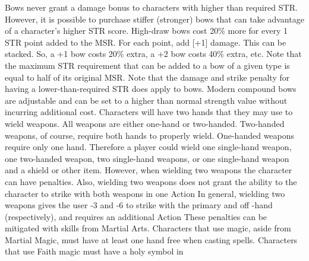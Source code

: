 \documentclass[twoside]{book}
\begin{document}
   Bows never grant a damage bonus to characters with
               higher than required STR. However, it is possible to
               purchase stiffer (stronger) bows that can take advantage
               of a character's higher STR score. High-draw bows
               cost 20\% more for every 1 STR point added to the MSR. For
               each point, add [+1] damage. This can be stacked. So, a +1
               bow costs 20\% extra, a +2 bow costs 40\% extra, etc. Note
               that the maximum STR requirement that can be added to a
               bow of a given type is equal to half of its original MSR.
               Note that the damage and strike penalty for having a
               lower-than-required STR does apply to bows. Modern
               compound bows are adjustable and can be set to a higher
               than normal strength value without incurring additional
               cost.  Characters will have two hands that they may use to
               wield weapons. All weapons are either one-hand or
               two-handed. Two-handed weapons, of course, require both
               hands to properly wield. One-handed weapons require only
               one hand. Therefore a player could wield one single-hand
               weapon, one two-handed weapon, two single-hand weapons, or
               one single-hand weapon and a shield or other item.
               However, when wielding two weapons the character can have
               penalties. Also, wielding two weapons does not grant the
               ability to the character to strike with both weapons in
               one Action In general, wielding two weapons gives the user
               -3 and -6 to strike with the primary and off -hand
               (respectively), and requires an additional Action These
               penalties can be mitigated with skills from Martial Arts.
                Characters that use magic, aside from Martial Magic,
               must have at least one hand free when casting spells.
               Characters that use Faith magic must have a holy symbol in
\end{document}
